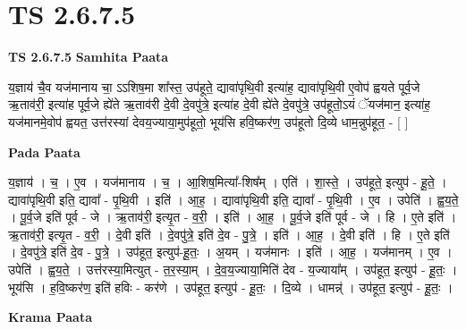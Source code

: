 \documentclass[17pt]{extarticle}
\begin{document}
\section{ TS 2.6.7.5 }

\textbf{TS 2.6.7.5 } \newline
\textbf{Samhita Paata} \newline

य॒ज्ञाय॑ चै॒व यज॑मानाय चा॒ ऽऽशिष॒मा शा᳚स्त॒ उप॑हूते॒ द्यावा॑पृथि॒वी इत्या॑ह॒ द्यावा॑पृथि॒वी ए॒वोप॑ ह्वयते पूर्व॒जे ऋ॒ताव॑री॒ इत्या॑ह पूर्व॒जे ह्ये॑ते ऋ॒ताव॑री दे॒वी दे॒वपु॑त्रे॒ इत्या॑ह दे॒वी ह्ये॑ते दे॒वपु॑त्रे॒ उप॑हूतो॒ऽयं ॅयज॑मान॒ इत्या॑ह॒ यज॑मानमे॒वोप॑ ह्वयत॒ उत्त॑रस्यां देवय॒ज्याया॒मुप॑हूतो॒ भूय॑सि हवि॒ष्कर॑ण॒ उप॑हूतो दि॒व्ये धाम॒न्नुप॑हूत॒ - [  ] \newline

\textbf{Pada Paata} \newline

य॒ज्ञाय॑ । च॒ । ए॒व । यज॑मानाय । च॒ । आ॒शिष॒मित्या᳚-शिष᳚म् । एति॑ । शा॒स्ते॒ । उप॑हूते॒ इत्युप॑ - हू॒ते॒ । द्यावा॑पृथि॒वी इति॒ द्यावा᳚ - पृ॒थि॒वी । इति॑ । आ॒ह॒ । द्यावा॑पृथि॒वी इति॒ द्यावा᳚ - पृ॒थि॒वी । ए॒व । उपेति॑ । ह्व॒य॒ते॒ । पू॒र्व॒जे इति॑ पूर्व - जे । ऋ॒ताव॑री॒ इत्यृ॒त - व॒री॒ । इति॑ । आ॒ह॒ । पू॒र्व॒जे इति॑ पूर्व - जे । हि । ए॒ते इति॑ । ऋ॒ताव॑री॒ इत्यृ॒त - व॒री॒ । दे॒वी इति॑ । दे॒वपु॑त्रे॒ इति॑ दे॒व - पु॒त्रे॒ । इति॑ । आ॒ह॒ । दे॒वी इति॑ । हि । ए॒ते इति॑ । दे॒वपु॑त्रे॒ इति॑ दे॒व - पु॒त्रे॒ । उप॑हूत॒ इत्युप॑-हू॒तः॒ । अ॒यम् । यज॑मानः । इति॑ । आ॒ह॒ । यज॑मानम् । ए॒व । उपेति॑ । ह्व॒य॒ते॒ । उत्त॑रस्या॒मित्युत् - त॒र॒स्या॒म् । दे॒व॒य॒ज्याया॒मिति॑ देव - य॒ज्याया᳚म् । उप॑हूत॒ इत्युप॑ - हू॒तः॒ । भूय॑सि । ह॒वि॒ष्कर॑ण॒ इति॑ हविः - कर॑णे । उप॑हूत॒ इत्युप॑ - हू॒तः॒ । दि॒व्ये । धामन्न्॑ । उप॑हूत॒ इत्युप॑ - हू॒तः॒ ।  \newline


\textbf{Krama Paata} \newline
\end{document}
